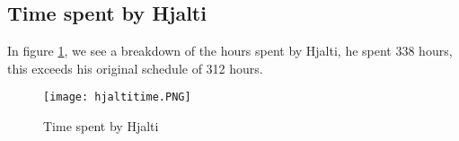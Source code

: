 \subsection{Time spent by Hjalti}
In figure \ref{fig:hjaltitime}, we see a breakdown of the hours spent by Hjalti, he spent 338 hours, this exceeds his original schedule of 312 hours. 
\begin{figure}[H]
	\centering
	\graphicspath{ {./graphics/} }
    \centerline{\texttt{[image: hjaltitime.PNG]}}
    \caption{\label{fig:hjaltitime}Time spent by Hjalti}
\end{figure}